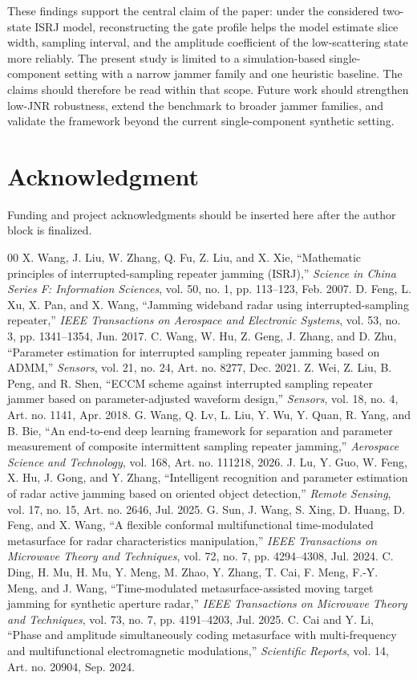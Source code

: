 \documentclass[conference]{IEEEtran}
\begin{document}
These findings support the central claim of the paper: under the considered two-state ISRJ model, reconstructing the gate profile helps the model estimate slice width, sampling interval, and the amplitude coefficient of the low-scattering state more reliably. The present study is limited to a simulation-based single-component setting with a narrow jammer family and one heuristic baseline. The claims should therefore be read within that scope. Future work should strengthen low-JNR robustness, extend the benchmark to broader jammer families, and validate the framework beyond the current single-component synthetic setting.


\section*{Acknowledgment}
Funding and project acknowledgments should be inserted here after the author block is finalized.

\begin{thebibliography}{00}
 X. Wang, J. Liu, W. Zhang, Q. Fu, Z. Liu, and X. Xie, ``Mathematic principles of interrupted-sampling repeater jamming (ISRJ),'' \emph{Science in China Series F: Information Sciences}, vol. 50, no. 1, pp. 113--123, Feb. 2007.
 D. Feng, L. Xu, X. Pan, and X. Wang, ``Jamming wideband radar using interrupted-sampling repeater,'' \emph{IEEE Transactions on Aerospace and Electronic Systems}, vol. 53, no. 3, pp. 1341--1354, Jun. 2017.
 C. Wang, W. Hu, Z. Geng, J. Zhang, and D. Zhu, ``Parameter estimation for interrupted sampling repeater jamming based on ADMM,'' \emph{Sensors}, vol. 21, no. 24, Art. no. 8277, Dec. 2021.
 Z. Wei, Z. Liu, B. Peng, and R. Shen, ``ECCM scheme against interrupted sampling repeater jammer based on parameter-adjusted waveform design,'' \emph{Sensors}, vol. 18, no. 4, Art. no. 1141, Apr. 2018.
 G. Wang, Q. Lv, L. Liu, Y. Wu, Y. Quan, R. Yang, and B. Bie, ``An end-to-end deep learning framework for separation and parameter measurement of composite intermittent sampling repeater jamming,'' \emph{Aerospace Science and Technology}, vol. 168, Art. no. 111218, 2026.
 J. Lu, Y. Guo, W. Feng, X. Hu, J. Gong, and Y. Zhang, ``Intelligent recognition and parameter estimation of radar active jamming based on oriented object detection,'' \emph{Remote Sensing}, vol. 17, no. 15, Art. no. 2646, Jul. 2025.
 G. Sun, J. Wang, S. Xing, D. Huang, D. Feng, and X. Wang, ``A flexible conformal multifunctional time-modulated metasurface for radar characteristics manipulation,'' \emph{IEEE Transactions on Microwave Theory and Techniques}, vol. 72, no. 7, pp. 4294--4308, Jul. 2024.
 C. Ding, H. Mu, H. Mu, Y. Meng, M. Zhao, Y. Zhang, T. Cai, F. Meng, F.-Y. Meng, and J. Wang, ``Time-modulated metasurface-assisted moving target jamming for synthetic aperture radar,'' \emph{IEEE Transactions on Microwave Theory and Techniques}, vol. 73, no. 7, pp. 4191--4203, Jul. 2025.
 C. Cai and Y. Li, ``Phase and amplitude simultaneously coding metasurface with multi-frequency and multifunctional electromagnetic modulations,'' \emph{Scientific Reports}, vol. 14, Art. no. 20904, Sep. 2024.
\end{thebibliography}
\end{document}
